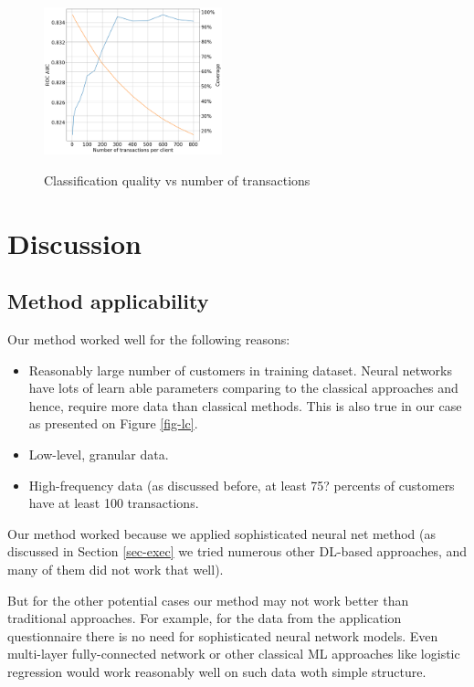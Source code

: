 \documentclass[sigconf]{acmart}
\begin{document}
\begin{figure}[ht]
  \caption{Classification quality vs number of transactions}
  \includegraphics[width=0.46\textwidth]{figures/information-vs-accuracy-max.png}
  \label{fig-tc}
\end{figure}

\section{Discussion}

\subsection{Method applicability}

Our method worked well for the following reasons:
\begin{itemize}
    \item Reasonably large number of customers in training dataset. Neural networks have lots of learn able parameters comparing to the classical approaches and hence, require more data than classical methods. This is also true in our case as presented on Figure \ref{fig-lc}.
    \item Low-level, granular data.
    \item High-frequency data (as discussed before, at least 75? percents of customers have at least 100 transactions.
\end{itemize}

Our method worked because we applied sophisticated neural net method (as discussed in Section \ref{sec-exec} we tried numerous other DL-based approaches, and many of them did not work that well).

But for the other potential cases our method may not work better than traditional approaches. For example, for the data from the application questionnaire there is no need for sophisticated neural network models. Even multi-layer fully-connected network or other classical ML approaches like logistic regression would work reasonably well on such data woth simple structure.
\end{document}
